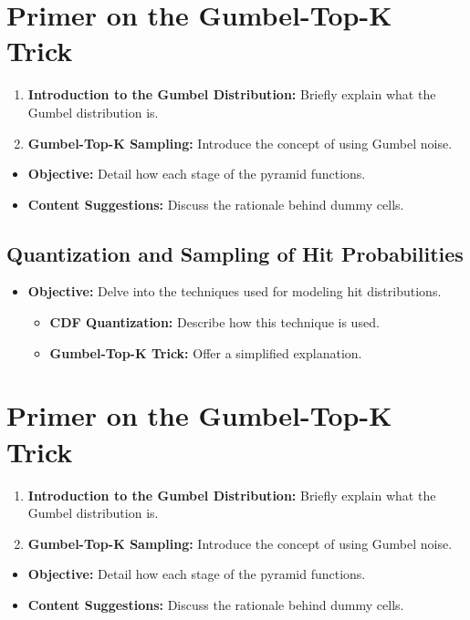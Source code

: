 \section{Primer on the Gumbel-Top-K Trick}

\begin{enumerate}
\item \textbf{Introduction to the Gumbel Distribution:} Briefly explain what the Gumbel distribution is.
\item \textbf{Gumbel-Top-K Sampling:} Introduce the concept of using Gumbel noise.
\end{enumerate}
\begin{itemize}
\item \textbf{Objective:} Detail how each stage of the pyramid functions.
\item \textbf{Content Suggestions:} Discuss the rationale behind dummy cells.
\end{itemize}

\subsection{Quantization and Sampling of Hit Probabilities}

\begin{itemize}
\item \textbf{Objective:} Delve into the techniques used for modeling hit distributions.
\begin{itemize}
\item \textbf{CDF Quantization:} Describe how this technique is used.
\item \textbf{Gumbel-Top-K Trick:} Offer a simplified explanation.
\end{itemize}
\end{itemize}

\section{Primer on the Gumbel-Top-K Trick}

\begin{enumerate}
\item \textbf{Introduction to the Gumbel Distribution:} Briefly explain what the Gumbel distribution is.
\item \textbf{Gumbel-Top-K Sampling:} Introduce the concept of using Gumbel noise.
\end{enumerate}
\begin{frame}[t]
\begin{itemize}
\item \textbf{Objective:} Detail how each stage of the pyramid functions.
\item \textbf{Content Suggestions:} Discuss the rationale behind dummy cells.
\end{itemize}

\end{frame}

